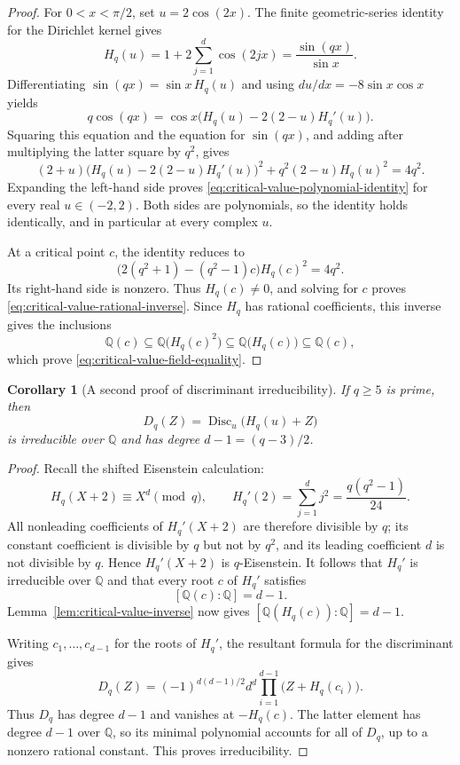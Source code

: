 \documentclass[11pt,a4paper]{article}
\newtheorem{corollary}[theorem]{Corollary}
\theoremstyle{definition}
\theoremstyle{remark}
\newcommand{\QQ}{\mathbb Q}
\newcommand{\Disc}{\operatorname{Disc}}
\begin{document}
\begin{proof}
For $0<x<\pi/2$, set $u=2\cos(2x)$.  The finite geometric-series identity
for the Dirichlet kernel gives
\[
 H_q(u)=1+2\sum_{j=1}^{d}\cos(2jx)
       =\frac{\sin(qx)}{\sin x}.
\]
Differentiating $\sin(qx)=\sin x\,H_q(u)$ and using
$du/dx=-8\sin x\cos x$ yields
\[
 q\cos(qx)
 =\cos x\bigl(H_q(u)-2(2-u)H_q'(u)\bigr).
\]
Squaring this equation and the equation for $\sin(qx)$, and adding after
multiplying the latter square by $q^2$, gives
\[
 (2+u)\bigl(H_q(u)-2(2-u)H_q'(u)\bigr)^2
 +q^2(2-u)H_q(u)^2=4q^2.
\]
Expanding the left-hand side proves
\eqref{eq:critical-value-polynomial-identity} for every real $u\in(-2,2)$.
Both sides are polynomials, so the identity holds identically, and in
particular at every complex $u$.

At a critical point $c$, the identity reduces to
\[
 \bigl(2(q^2+1)-(q^2-1)c\bigr)H_q(c)^2=4q^2.
\]
Its right-hand side is nonzero.  Thus $H_q(c)\neq 0$, and solving for $c$
proves \eqref{eq:critical-value-rational-inverse}.  Since $H_q$ has rational
coefficients, this inverse gives the inclusions
\[
 \QQ(c)\subseteq\QQ\bigl(H_q(c)^2\bigr)
 \subseteq\QQ\bigl(H_q(c)\bigr)\subseteq\QQ(c),
\]
which prove \eqref{eq:critical-value-field-equality}.
\end{proof}

\begin{corollary}[A second proof of discriminant irreducibility]
\label{cor:critical-inverse-discriminant}
If $q\geq 5$ is prime, then
\[
 D_q(Z)=\Disc_u\bigl(H_q(u)+Z\bigr)
\]
is irreducible over $\QQ$ and has degree $d-1=(q-3)/2$.
\end{corollary}

\begin{proof}
Recall the shifted Eisenstein calculation:
\[
 H_q(X+2)\equiv X^d\pmod q,
 \qquad
 H_q'(2)=\sum_{j=1}^{d}j^2=\frac{q(q^2-1)}{24}.
\]
All nonleading coefficients of $H_q'(X+2)$ are therefore divisible by $q$;
its constant coefficient is divisible by $q$ but not by $q^2$, and its
leading coefficient $d$ is not divisible by $q$.  Hence $H_q'(X+2)$ is
$q$-Eisenstein.  It follows that $H_q'$ is irreducible over $\QQ$ and that
every root $c$ of $H_q'$ satisfies
\[
 [\QQ(c):\QQ]=d-1.
\]
Lemma~\ref{lem:critical-value-inverse} now gives
$[\QQ(H_q(c)):\QQ]=d-1$.

Writing $c_1,\ldots,c_{d-1}$ for the roots of $H_q'$, the resultant formula
for the discriminant gives
\[
 D_q(Z)=(-1)^{d(d-1)/2}d^d
        \prod_{i=1}^{d-1}\bigl(Z+H_q(c_i)\bigr).
\]
Thus $D_q$ has degree $d-1$ and vanishes at $-H_q(c)$.  The latter element
has degree $d-1$ over $\QQ$, so its minimal polynomial accounts for all of
$D_q$, up to a nonzero rational constant.  This proves irreducibility.
\end{proof}
\end{document}
